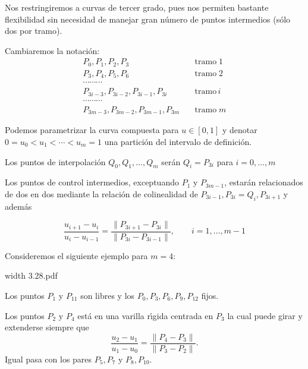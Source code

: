 \documentclass[twoside]{report}
\newcommand{\colocapdf}[2]{\quad\pdfimage width #2 {#1.pdf}}
\begin{document}
\vspace{0.2cm}

Nos restringiremos a curvas de tercer grado, pues nos permiten bastante flexibilidad sin necesidad de manejar gran n\'{u}mero de puntos intermedios (s\'{o}lo dos por tramo).

\vspace{0.2cm}

Cambiaremos la notaci\'{o}n:
$$\begin{array}{ll} P_0,P_1,P_2,P_3& \quad \mbox{tramo}\; 1\\P_3,P_4,P_5,P_6&\quad \mbox{tramo}\; 2\\ \cdots \cdots \cdots & \\ P_{3i-3},P_{3i-2},P_{3i-1},P_{3i} & \quad \mbox{tramo}\, i\\  \cdots \cdots \cdots & \\ P_{3m-3},P_{3m-2},P_{3m-1},P_{3m} & \quad \mbox{tramo}\; m \end{array}$$

\vspace{0.2cm}

Podemos parametrizar la curva compuesta para $u\in [0,1]$ y denotar $0=u_0<u_1< \cdots<u_m=1$ una partici\'{o}n del intervalo de definici\'{o}n.

\vspace{0.2cm}

Los puntos de interpolaci\'{o}n $Q_0,Q_1,\ldots,Q_m$ ser\'{a}n $Q_i=P_{3i}$ para $i=0,\ldots,m$

Los puntos de control intermedios, exceptuando $P_1$ y $P_{3m-1}$, estar\'{a}n relacionados de dos en dos mediante la relaci\'{o}n de colinealidad de $P_{3i-1},P_{3i}=Q_i, P_{3i+1}$ y adem\'{a}s

$$\frac{u_{i+1}-u_i}{u_i-u_{i-1}}= \frac{\parallel P_{3i+1}-P_{3i}\parallel}{\parallel P_{3i}-P_{3i-1} \parallel},\quad \quad i=1,\ldots,m-1$$

\vspace{0.2cm}

Consideremos el siguiente ejemplo para $m=4$:

\vspace{0.2cm}

\begin{minipage}{.4\textwidth}\colocapdf{3.28}{\textwidth}
\end{minipage} \quad \quad
\begin{minipage}{.55\textwidth}
Los puntos $P_1$ y $P_{11}$ son libres y los $P_0,P_3,P_6,P_9,P_{12}$ fijos.

Los puntos $P_2$ y $P_4$ est\'{a} en una varilla r\'{\i}gida centrada en $P_3$ la cual puede girar y extenderse siempre que
$$\frac{u_2-u_1}{u_1-u_0}= \frac{\parallel P_4-P_3\parallel}{\parallel P_3-P_2 \parallel}.$$
Igual pasa con los pares $P_5,P_7$ y $P_8,P_{10}$.
\end{minipage}
\end{document}
